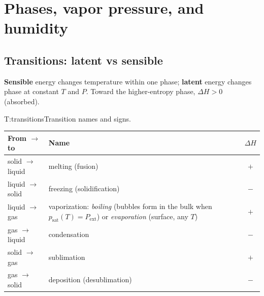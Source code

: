 \section{Phases, vapor pressure, and humidity}\label{sec:phases}
\begin{multicols}{2}
\subsection{Transitions: latent vs sensible}\label{sec:transitions}
\CORE{} \textbf{Sensible} energy changes temperature within one phase; \textbf{latent} energy changes phase at constant $T$ and $P$. Toward the higher-entropy phase, $\Delta H>0$ (absorbed).

\begin{reftab}{T:transitions}{Transition names and signs.}
\small
\begin{tabularx}{\linewidth}{@{}lYc@{}}
\toprule
From $\to$ to & Name & $\Delta H$\\
\midrule
solid $\to$ liquid & melting (fusion) & $+$\\
liquid $\to$ solid & freezing (solidification) & $-$\\
liquid $\to$ gas & vaporization: \emph{boiling} (bubbles form in the bulk when $p_{\text{sat}}(T)=P_{\text{ext}}$) or \emph{evaporation} (surface, any $T$) & $+$\\
gas $\to$ liquid & condensation & $-$\\
solid $\to$ gas & sublimation & $+$\\
gas $\to$ solid & deposition (desublimation) & $-$\\
\bottomrule
\end{tabularx}\end{reftab}
\end{multicols}

